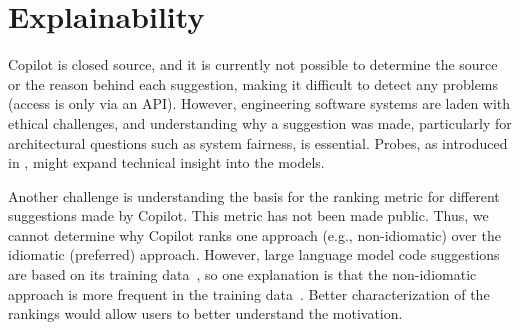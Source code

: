 \section{Explainability}
\label{explain}
Copilot is closed source, and it is currently not possible to determine the source or the reason behind each suggestion, making it difficult to detect any problems (access is only via an API). 
However, engineering software systems are laden with ethical challenges, and understanding why a suggestion was made, particularly for architectural questions such as system fairness, is essential. 
Probes, as introduced in \cite{karmakar21}, might expand technical insight into the models.

Another challenge is understanding the basis for the ranking metric for different suggestions made by Copilot. 
This metric has not been made public. 
Thus, we cannot determine why Copilot ranks one approach (e.g., non-idiomatic) over the idiomatic (preferred) approach. However, large language model code suggestions are based on its training data~\cite{training_extraction}, so one explanation is that the non-idiomatic approach is more frequent in the training data~\cite{stochastic_parrots}. 
Better characterization of the rankings would allow users to better understand the motivation. 